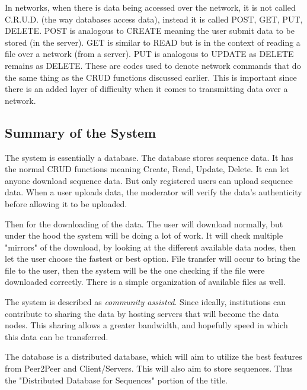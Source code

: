 \documentclass[acmsmall]{acmart}
\begin{document}
In networks, when there is data being accessed over the network, it is not called C.R.U.D. (the way databases access data), instead it is called POST, GET, PUT, DELETE. POST is analogous to CREATE meaning the user submit data to be stored (in the server). GET is similar to READ but is in the context of reading a file over a network (from a server). PUT is analogous to UPDATE as DELETE remains as DELETE. These are codes used to denote network commands that do the same thing as the CRUD functions discussed earlier. This is important since there is an added layer of difficulty when it comes to transmitting data over a network. 


\subsection{Summary of the System}

The system is essentially a database. The database stores sequence data. It has the normal CRUD functions meaning Create, Read, Update, Delete. It can let anyone download sequence data. But only registered users can upload sequence data. When a user uploads data, the moderator will verify the data's authenticity before allowing it to be uploaded. 

Then for the downloading of the data. The user will download normally, but under the hood the system will be doing a lot of work. It will check multiple "mirrors" of the download, by looking at the different available data nodes, then let the user choose the fastest or best option. File transfer will occur to bring the file to the user, then the system will be the one checking if the file were downloaded correctly. There is a simple organization of available files as well.

The system is described as \textit{community assisted}. Since ideally, institutions can contribute to sharing the data by hosting servers that will become the data nodes. This sharing allows a greater bandwidth, and hopefully speed in which this data can be transferred. 

The database is a distributed database, which will aim to utilize the best features from Peer2Peer and Client/Servers. This will also aim to store sequences. Thus the "Distributed Database for Sequences" portion of the title.
\end{document}

